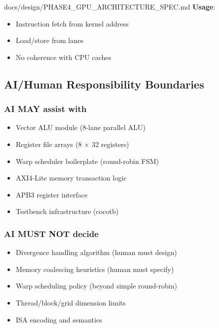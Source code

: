 \begin{relocated}{docs/design/PHASE4_GPU_ARCHITECTURE_SPEC.md}
\textbf{Usage}:

\begin{itemize}
\tightlist
\item
  Instruction fetch from kernel address
\item
  Load/\allowbreak{}store from lanes
\item
  No coherence with CPU caches
\end{itemize}

\subsection{AI/Human Responsibility Boundaries}\label{ds:ch:phase4-gpu-architecture:aihuman-responsibility-boundaries}

\subsubsection{AI MAY assist with}\label{ds:ch:phase4-gpu-architecture:ai-may-assist-with}

\begin{itemize}
\tightlist
\item
  Vector ALU module (8-lane parallel ALU)
\item
  Register file arrays (8 × 32 registers)
\item
  Warp scheduler boilerplate (round-robin FSM)
\item
  AXI4-Lite memory transaction logic
\item
  APB3 register interface
\item
  Testbench infrastructure (cocotb)
\end{itemize}

\subsubsection{AI MUST NOT decide}\label{ds:ch:phase4-gpu-architecture:ai-must-not-decide}

\begin{itemize}
\tightlist
\item
  Divergence handling algorithm (human must design)
\item
  Memory coalescing heuristics (human must specify)
\item
  Warp scheduling policy (beyond simple round-robin)
\item
  Thread/\allowbreak{}block/\allowbreak{}grid dimension limits
\item
  ISA encoding and semantics
\end{itemize}


\end{relocated}
